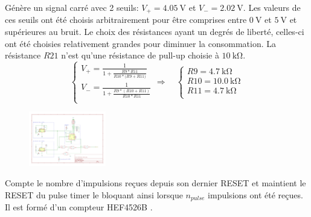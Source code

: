 \documentclass[french]{layout/Report}
\begin{document}
\begin{description}[leftmargin=!,labelwidth=3cm, labelindent=\parindent]
	\item[Schmitt trigger] Génère un signal carré avec 2 seuils: $V_+ = \SI{4.05}{\volt}$ et $V_- = \SI{2.02}{\volt}$. Les valeurs de ces seuils ont été choisis arbitrairement pour être comprises entre $\SI{0}{\volt}$ et $\SI{5}{\volt}$ et supérieures au bruit. Le choix des résistances ayant un degrés de liberté, celles-ci ont été choisies relativement grandes pour diminuer la consommation. La résistance $\mathit{R21}$ n'est qu'une résistance de pull-up choisie à $\SI{10}{\kilo\ohm}$.
	\begin{equation*}
		\begin{cases}
			V_+ = \frac{1}{1+\frac{\mathit{R9}*\mathit{R11}}{\mathit{R10}*(\mathit{R9+\mathit{R11})}}} \\
			V_- = \frac{1}{1+\frac{\mathit{R9}*(\mathit{R10}+\mathit{R11})}{\mathit{R10}*\mathit{R11}}} \\
		\end{cases}
		\Rightarrow\quad
		\begin{cases}
			\mathit{R9}  = \SI{4.7}{\kilo\ohm} \\
			\mathit{R10} = \SI{10.0}{\kilo\ohm} \\
			\mathit{R11} = \SI{4.7}{\kilo\ohm} \\
		\end{cases}
		\end{equation*}

        \begin{figure}[H]
        \centering
        \includegraphics[width=0.3\textwidth]{fig/pulse_timer.pdf}
        \end{figure}

	\item[Down counter] Compte le nombre d'impulsions reçues depuis son dernier RESET et maintient le RESET du pulse timer le bloquant ainsi lorsque $n_{pulse}$ impulsions ont été reçues. Il est formé d'un compteur HEF4526B \cite{HEF4526B}.


\end{description}
\end{document}
